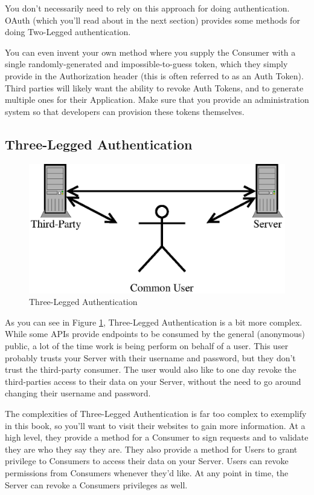 \documentclass{book}
\begin{document}
You don't necessarily need to rely on this approach for doing authentication. OAuth (which you'll read about in the next section) provides some methods for doing Two-Legged authentication.

You can even invent your own method where you supply the Consumer with a single randomly-generated and impossible-to-guess token, which they simply provide in the Authorization header (this is often referred to as an Auth Token). Third parties will likely want the ability to revoke Auth Tokens, and to generate multiple ones for their Application. Make sure that you provide an administration system so that developers can provision these tokens themselves.

\subsection{Three-Legged Authentication}

\begin{figure}[!htb]
\centering
\includegraphics[scale=.6]{images/three-legged.eps}
\caption{Three-Legged Authentication}
\label{fig:threelegged}
\end{figure}

As you can see in Figure \ref{fig:threelegged}, Three-Legged Authentication is a bit more complex. While some APIs provide endpoints to be consumed by the general (anonymous) public, a lot of the time work is being perform on behalf of a user. This user probably trusts your Server with their username and password, but they don't trust the third-party consumer. The user would also like to one day revoke the third-parties access to their data on your Server, without the need to go around changing their username and password.

The complexities of Three-Legged Authentication is far too complex to exemplify in this book, so you'll want to visit their websites to gain more information. At a high level, they provide a method for a Consumer to sign requests and to validate they are who they say they are. They also provide a method for Users to grant privilege to Consumers to access their data on your Server. Users can revoke permissions from Consumers whenever they'd like. At any point in time, the Server can revoke a Consumers privileges as well.
\end{document}
